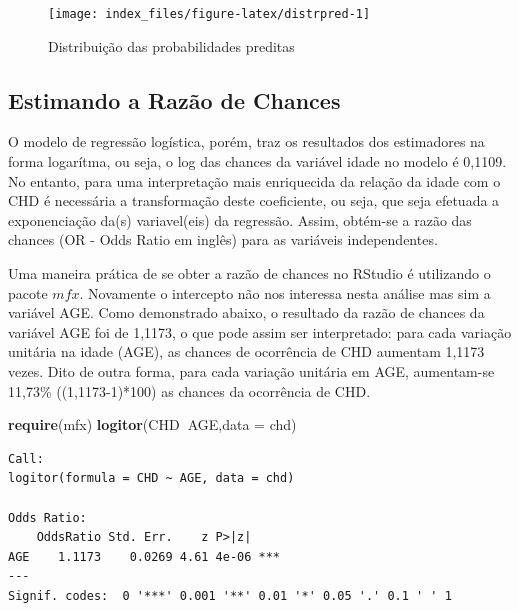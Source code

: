 \documentclass[12pt,brazil,oneside]{book}
\newenvironment{Shaded}{\begin{snugshade}}{\end{snugshade}}
\newcommand{\DataTypeTok}[1]{\textcolor[rgb]{0.13,0.29,0.53}{#1}}
\newcommand{\KeywordTok}[1]{\textcolor[rgb]{0.13,0.29,0.53}{\textbf{#1}}}
\newcommand{\NormalTok}[1]{#1}
\newcommand{\OperatorTok}[1]{\textcolor[rgb]{0.81,0.36,0.00}{\textbf{#1}}}
\begin{document}
\begin{figure}[H]

{\centering \texttt{[image: index\_files/figure-latex/distrpred-1]} 

}

\caption{Distribuição das probabilidades preditas}\label{fig:distrpred}
\end{figure}

\hypertarget{estimando-a-razao-de-chances}{%
\subsection{Estimando a Razão de Chances}\label{estimando-a-razao-de-chances}}

O modelo de regressão logística, porém, traz os resultados dos estimadores na forma logarítma, ou seja, o log das chances da variável idade no modelo é 0,1109. No entanto, para uma interpretação mais enriquecida da relação da idade com o CHD é necessária a transformação deste coeficiente, ou seja, que seja efetuada a exponenciação da(s) variavel(eis) da regressão. Assim, obtém-se a razão das chances (OR - Odds Ratio em inglês) para as variáveis independentes.

Uma maneira prática de se obter a razão de chances no RStudio é utilizando o pacote \(mfx\). Novamente o intercepto não nos interessa nesta análise mas sim a variável AGE. Como demonstrado abaixo, o resultado da razão de chances da variável AGE foi de 1,1173, o que pode assim ser interpretado: para cada variação unitária na idade (AGE), as chances de ocorrência de CHD aumentam 1,1173 vezes. Dito de outra forma, para cada variação unitária em AGE, aumentam-se 11,73\% ((1,1173-1)*100) as chances da ocorrência de CHD.

\begin{Shaded}
\begin{Highlighting}[]
\KeywordTok{require}\NormalTok{(mfx)}
\KeywordTok{logitor}\NormalTok{(CHD}\OperatorTok{~}\NormalTok{AGE,}\DataTypeTok{data =}\NormalTok{ chd)}
\end{Highlighting}
\end{Shaded}

\begin{verbatim}
Call:
logitor(formula = CHD ~ AGE, data = chd)

Odds Ratio:
    OddsRatio Std. Err.    z P>|z|    
AGE    1.1173    0.0269 4.61 4e-06 ***
---
Signif. codes:  0 '***' 0.001 '**' 0.01 '*' 0.05 '.' 0.1 ' ' 1
\end{verbatim}
\end{document}
